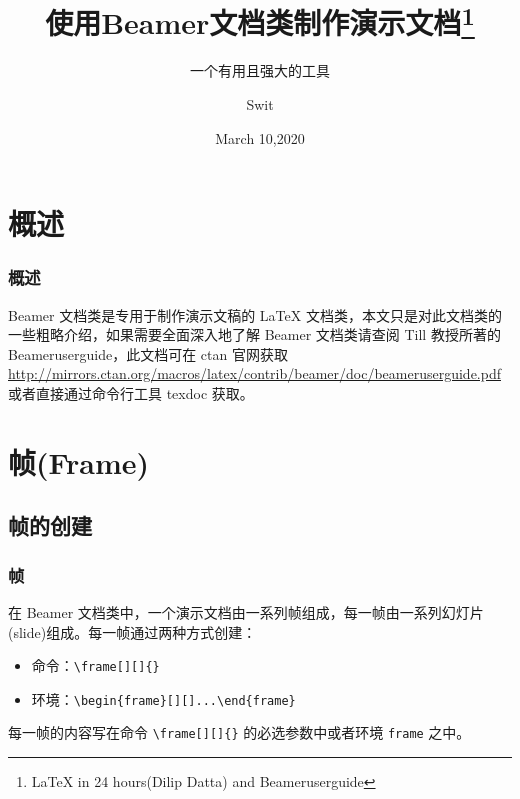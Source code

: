\documentclass{beamer}
\begin{document}
\begin{frame}
\title{使用Beamer文档类制作演示文档\thanks{\LaTeX{} in 24 hours(Dilip Datta) and Beameruserguide}}
\subtitle{一个有用且强大的工具}
\author{Swit}
\date{March 10,2020}
\maketitle
\end{frame}

\begin{frame}
\begin{multicols}{2}
\tableofcontents
\end{multicols}
\end{frame}

\section{概述}
\begin{frame}
\frametitle{概述}
Beamer 文档类是专用于制作演示文稿的 \LaTeX{} 文档类，本文只是对此文档类的一些粗略介绍，如果需要全面深入地了解 Beamer 文档类请查阅 Till 教授所著的 Beameruserguide，此文档可在 ctan 官网获取 \url{http://mirrors.ctan.org/macros/latex/contrib/beamer/doc/beameruserguide.pdf} 或者直接通过命令行工具 texdoc 获取。
\end{frame}

\section{帧(Frame)}
\subsection{帧的创建}
\begin{frame}[containsverbatim]
\frametitle{帧}
在 Beamer 文档类中，一个演示文档由一系列帧组成，每一帧由一系列幻灯片(slide)组成。每一帧通过两种方式创建：
\begin{itemize}
\item 命令：\verb|\frame[][]{}|
\item 环境：\verb|\begin{frame}[][]...\end{frame}|
\end{itemize}
每一帧的内容写在命令 \verb|\frame[][]{}| 的必选参数中或者环境 \verb|frame| 之中。
\end{frame}
\end{document}
